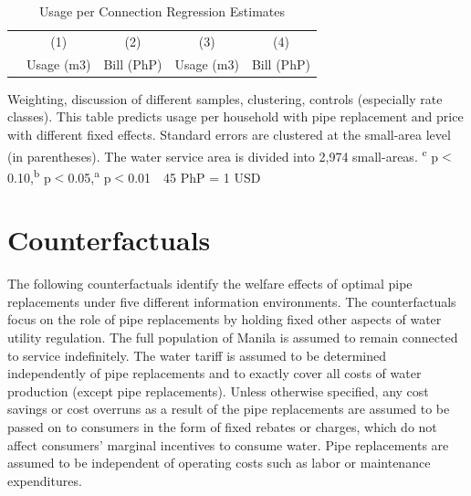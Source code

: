 \documentclass[12pt,table]{article}
\newcommand{\regtext}{
Standard errors are clustered at the small-area level (in parentheses).  The water service area is divided into 2,974 small-areas.
\textsuperscript{c} p$<$0.10,\textsuperscript{b} p$<$0.05,\textsuperscript{a} p$<$0.01 \,\,
}
\begin{document}
\begin{table}[h!] 
\centering
\caption{Usage per Connection Regression Estimates}\label{table:profitregs}
\vspace{-2mm}
\begin{threeparttable}
\begin{tabular}{@{}l*{1}{cccc}@{}}
\toprule
  & (1) & (2) & (3) & (4)  \\
  & Usage (m3) & Bill (PhP) & Usage (m3) & Bill (PhP) \\
\midrule

\bottomrule
\end{tabular}
\begin{tablenotes}
\footnotesize
\item Weighting, discussion of different samples, clustering, controls (especially rate classes).  This table predicts usage per household with pipe replacement and price with different fixed effects.   \regtext 45 PhP = 1 USD \,\,
\end{tablenotes}
\end{threeparttable}
\end{table}



\section{Counterfactuals}



The following counterfactuals identify the welfare effects of optimal pipe replacements under five different information environments.  The counterfactuals focus on the role of pipe replacements by holding fixed other aspects of water utility regulation.  The full population of Manila is assumed to remain connected to service indefinitely.  The water tariff is assumed to be determined independently of pipe replacements and to exactly cover all costs of water production (except pipe replacements).  Unless otherwise specified, any cost savings or cost overruns as a result of the pipe replacements are assumed to be passed on to consumers in the form of fixed rebates or charges, which do not affect consumers' marginal incentives to consume water.  Pipe replacements are assumed to be independent of operating costs such as labor or maintenance expenditures.
\end{document}
